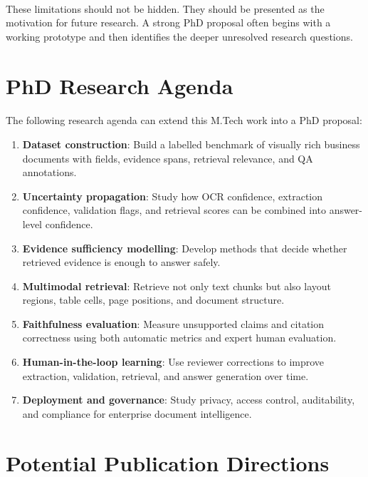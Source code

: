 \paragraph{} These limitations should not be hidden. They should be presented as the motivation for future research. A strong PhD proposal often begins with a working prototype and then identifies the deeper unresolved research questions.

\section{PhD Research Agenda}
\paragraph{} The following research agenda can extend this M.Tech work into a PhD proposal:

\begin{enumerate}
    \item \textbf{Dataset construction}: Build a labelled benchmark of visually rich business documents with fields, evidence spans, retrieval relevance, and QA annotations.
    \item \textbf{Uncertainty propagation}: Study how OCR confidence, extraction confidence, validation flags, and retrieval scores can be combined into answer-level confidence.
    \item \textbf{Evidence sufficiency modelling}: Develop methods that decide whether retrieved evidence is enough to answer safely.
    \item \textbf{Multimodal retrieval}: Retrieve not only text chunks but also layout regions, table cells, page positions, and document structure.
    \item \textbf{Faithfulness evaluation}: Measure unsupported claims and citation correctness using both automatic metrics and expert human evaluation.
    \item \textbf{Human-in-the-loop learning}: Use reviewer corrections to improve extraction, validation, retrieval, and answer generation over time.
    \item \textbf{Deployment and governance}: Study privacy, access control, auditability, and compliance for enterprise document intelligence.
\end{enumerate}

\section{Potential Publication Directions}

